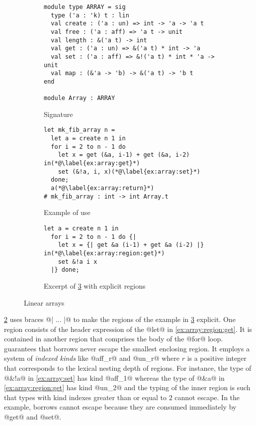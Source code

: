 \begin{figure}[tp]
  \centering
  \begin{subfigure}[t]{1\linewidth}
\begin{lstlisting}
module type ARRAY = sig
  type ('a : 'k) t : lin
  val create : ('a : un) => int -> 'a -> 'a t
  val free : ('a : aff) => 'a t -> unit
  val length : &('a t) -> int
  val get : ('a : un) => &('a t) * int -> 'a
  val set : ('a : aff) => &!('a t) * int * 'a -> unit
  val map : (&'a -> 'b) -> &('a t) -> 'b t
end

module Array : ARRAY
\end{lstlisting}
    \vspace{-15pt}
    \caption{Signature}
    \label{sig:array}
  \end{subfigure}

  \begin{subfigure}[t]{1\linewidth}
\begin{lstlisting}
let mk_fib_array n =
  let a = create n 1 in
  for i = 2 to n - 1 do
    let x = get (&a, i-1) + get (&a, i-2) in(*@\label{ex:array:get}*)
    set (&!a, i, x)(*@\label{ex:array:set}*)
  done;
  a(*@\label{ex:array:return}*)
# mk_fib_array : int -> int Array.t
\end{lstlisting}
    \vspace{-10pt}
    \caption{Example of use}
    \label{ex:array}
\begin{lstlisting}[firstnumber=2]
  let a = create n 1 in
  for i = 2 to n - 1 do {|
    let x = {| get &a (i-1) + get &a (i-2) |} in(*@\label{ex:array:region:get}*)
    set &!a i x
  |} done;
\end{lstlisting}
    \vspace{-10pt}
    \caption{Excerpt of \cref{ex:array} with explicit regions}
    \label{ex:array:region}
  \end{subfigure}
  \vspace{-5pt}
  \caption{Linear arrays}
  \label{ex:array}
\end{figure}

\cref{ex:array:region} uses braces @{| ... |}@ to make the
regions of the example in \cref{ex:array} explicit.  One
region consists of the header expression of the @let@ in
\cref{ex:array:region:get}. It is contained in another region that
comprises the body of the @for@ loop. \lang guarantees that borrows
never escape the smallest enclosing region. It employs a system of
\emph{indexed kinds} like @aff_r@ and @un_r@ where
$r$ is a positive integer that corresponds to the lexical nesting
depth of regions. For instance, the type of @&!a@ in
\cref{ex:array:set} has kind @aff_1@ whereas the type of
@&a@ in \cref{ex:array:region:get} has kind
@un_2@ and the typing of the inner region is such that types with
kind indexes greater than or equal to $2$ cannot escape.
In the example, borrows cannot escape  because they are consumed
immediately by @get@ and @set@.

